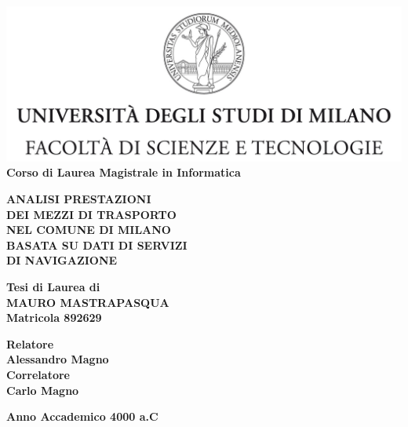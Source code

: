 \documentclass[a4paper]{report}
\begin{document}
	\begin{titlepage}
		\begin{center}
			\includegraphics[width=\textwidth]{Logo.jpg}\\
			{\large{\bf Corso di Laurea Magistrale in Informatica}}
		\end{center}
	
		\vspace{14mm}
		\begin{center}
			{\LARGE{\bf ANALISI PRESTAZIONI}}\\
			\vspace{3mm}
			{\LARGE{\bf DEI MEZZI DI TRASPORTO}}\\
			\vspace{4mm}
			{\LARGE{\bf NEL COMUNE DI MILANO}}\\
			\vspace{4mm}
			{\LARGE{\bf BASATA SU DATI DI SERVIZI}}\\
			\vspace{4mm}
			{\LARGE{\bf DI NAVIGAZIONE}}\\
		\end{center}
	
		\vspace{14mm}
		\begin{center}
			{\large{\bf Tesi di Laurea di}}\\
			\vspace{3mm}
			{\Large{\bf MAURO MASTRAPASQUA}}\\
			\vspace{2mm}
			{\large{\bf Matricola 892629}}\\
		\end{center}
	
		\vspace{14mm}
		\begin{flushleft}
			{\normalsize{\bf Relatore}}\\
			\vspace{1mm}
			{\large{\bf Alessandro Magno}}\\
			\vspace{4mm}
			{\normalsize{\bf Correlatore}}\\
			\vspace{1mm}
			{\large{\bf Carlo Magno}}\\
		\end{flushleft}
	
		\vspace{14mm}
		\begin{center}
			{\large{\bf Anno Accademico 4000 a.C}}
		\end{center}
	\end{titlepage}
\end{document}
